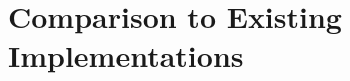 \documentclass{article}
\begin{document}
\section{Comparison to Existing Implementations}
\label{sec:comparison}



\end{document}
